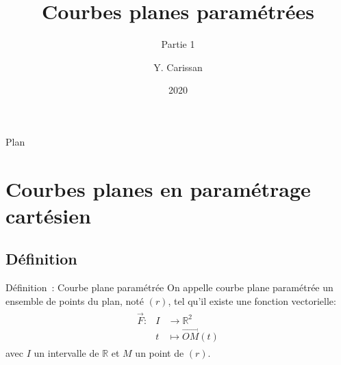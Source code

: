 \documentclass[14pt]{beamer}
\title{Courbes planes paramétrées}
\subtitle{Partie 1}
\author{Y. Carissan}
\date{2020}
\begin{document}
\begin{frame}{}
\maketitle
\end{frame}

\begin{frame}{Plan}
        \tableofcontents[hideallsubsections]
\end{frame}

\section{Courbes planes en paramétrage cartésien}
\subsection{Définition}
\begin{frame}
        \begin{alertblock}{Définition~: Courbe plane paramétrée}
        On appelle courbe plane paramétrée un ensemble de points du plan, noté $(r)$,
tel qu'il existe une fonction vectorielle:
                \begin{align*}
                \begin{array}{lll}
                        \vec{F}: & I &\to \mathbb{R}^2\\
                        & t &\mapsto \overrightarrow{OM}(t)
                \end{array}
                \end{align*}
avec $I$ un intervalle de $\mathbb{R}$ et $M$ un point de $(r)$.
\end{alertblock}
\end{frame}
\end{document}
